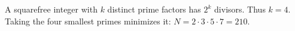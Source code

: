 A squarefree integer with $k$ distinct prime factors has $2^k$ divisors. Thus $k=4$. Taking the four smallest primes minimizes it: $N=2\cdot3\cdot5\cdot7=\boxed{210}$.
